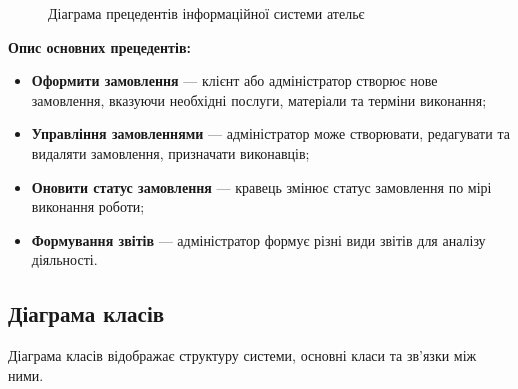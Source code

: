 \documentclass[14pt,a4paper]{extarticle}
\begin{document}
\begin{figure}[h!]
\caption{Діаграма прецедентів інформаційної системи ательє}
\end{figure}

\textbf{Опис основних прецедентів:}

\begin{itemize}
    \item \textbf{Оформити замовлення} --- клієнт або адміністратор створює нове замовлення, вказуючи необхідні послуги, матеріали та терміни виконання;
    \item \textbf{Управління замовленнями} --- адміністратор може створювати, редагувати та видаляти замовлення, призначати виконавців;
    \item \textbf{Оновити статус замовлення} --- кравець змінює статус замовлення по мірі виконання роботи;
    \item \textbf{Формування звітів} --- адміністратор формує різні види звітів для аналізу діяльності.
\end{itemize}

\newpage
\subsection{Діаграма класів}

Діаграма класів відображає структуру системи, основні класи та зв'язки між ними.
\end{document}
